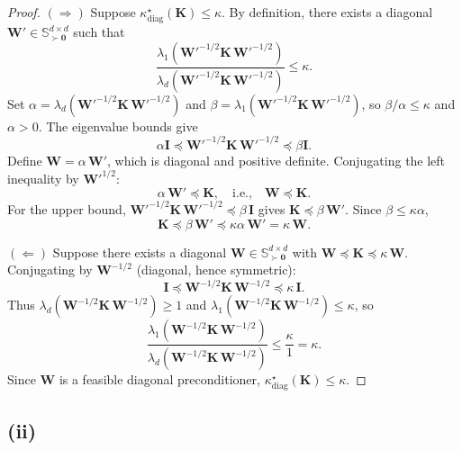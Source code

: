 \documentclass[12pt]{article}
\begin{document}
\begin{proof}
$(\Rightarrow)$\; Suppose $\kappa^\star_{\mathrm{diag}}(\mathbf{K}) \le \kappa$. By definition, there exists a diagonal $\mathbf{W}' \in \mathbb{S}^{d \times d}_{\succ \mathbf{0}}$ such that
\[
\frac{\lambda_1\!\left(\mathbf{W}'^{-1/2}\mathbf{K}\,\mathbf{W}'^{-1/2}\right)}{\lambda_d\!\left(\mathbf{W}'^{-1/2}\mathbf{K}\,\mathbf{W}'^{-1/2}\right)} \le \kappa.
\]
Set $\alpha = \lambda_d\!\left(\mathbf{W}'^{-1/2}\mathbf{K}\,\mathbf{W}'^{-1/2}\right)$ and $\beta = \lambda_1\!\left(\mathbf{W}'^{-1/2}\mathbf{K}\,\mathbf{W}'^{-1/2}\right)$, so $\beta/\alpha \le \kappa$ and $\alpha > 0$. The eigenvalue bounds give
\[
\alpha \mathbf{I} \preceq \mathbf{W}'^{-1/2}\mathbf{K}\,\mathbf{W}'^{-1/2} \preceq \beta \mathbf{I}.
\]
Define $\mathbf{W} = \alpha\,\mathbf{W}'$, which is diagonal and positive definite. Conjugating the left inequality by $\mathbf{W}'^{1/2}$:
\[
\alpha\,\mathbf{W}' \preceq \mathbf{K}, \quad\text{i.e.,}\quad \mathbf{W} \preceq \mathbf{K}.
\]
For the upper bound, $\mathbf{W}'^{-1/2}\mathbf{K}\,\mathbf{W}'^{-1/2} \preceq \beta\,\mathbf{I}$ gives $\mathbf{K} \preceq \beta\,\mathbf{W}'$. Since $\beta \le \kappa\alpha$,
\[
\mathbf{K} \preceq \beta\,\mathbf{W}' \preceq \kappa\alpha\,\mathbf{W}' = \kappa\,\mathbf{W}.
\]

$(\Leftarrow)$\; Suppose there exists a diagonal $\mathbf{W} \in \mathbb{S}^{d \times d}_{\succ \mathbf{0}}$ with $\mathbf{W} \preceq \mathbf{K} \preceq \kappa\,\mathbf{W}$. Conjugating by $\mathbf{W}^{-1/2}$ (diagonal, hence symmetric):
\[
\mathbf{I} \preceq \mathbf{W}^{-1/2}\mathbf{K}\,\mathbf{W}^{-1/2} \preceq \kappa\,\mathbf{I}.
\]
Thus $\lambda_d\!\left(\mathbf{W}^{-1/2}\mathbf{K}\,\mathbf{W}^{-1/2}\right) \ge 1$ and $\lambda_1\!\left(\mathbf{W}^{-1/2}\mathbf{K}\,\mathbf{W}^{-1/2}\right) \le \kappa$, so
\[
\frac{\lambda_1\!\left(\mathbf{W}^{-1/2}\mathbf{K}\,\mathbf{W}^{-1/2}\right)}{\lambda_d\!\left(\mathbf{W}^{-1/2}\mathbf{K}\,\mathbf{W}^{-1/2}\right)} \le \frac{\kappa}{1} = \kappa.
\]
Since $\mathbf{W}$ is a feasible diagonal preconditioner, $\kappa^\star_{\mathrm{diag}}(\mathbf{K}) \le \kappa$.
\end{proof}

\subsection*{(ii)}
\end{document}
